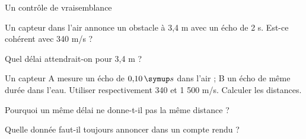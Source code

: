 \par\noindent\begin{minipage}{\linewidth}
\begin{exercice}[3]{Un contrôle de vraisemblance}
\begin{questions}
\item Un capteur dans l’air annonce un obstacle à 3,4 m avec un écho de 2 s. Est-ce cohérent avec 340 m/s ?
\item Quel délai attendrait-on pour 3,4 m ?
\end{questions}
\end{exercice}
\end{minipage}
\label{defi-ex-19}
\begin{questions}
\item Un capteur A mesure un écho de $0{,}10\unite s$ dans l’air ; B un écho de même durée dans l’eau. Utiliser respectivement 340 et 1 500 m/s. Calculer les distances.
\item Pourquoi un même délai ne donne-t-il pas la même distance ?
\item Quelle donnée faut-il toujours annoncer dans un compte rendu ?
\end{questions}
\pcGrille
